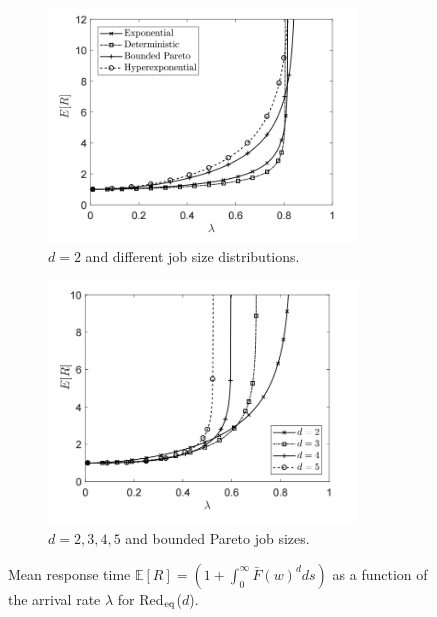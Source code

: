 \documentclass[12pt]{report}
\newcommand{\Redid}{Red$_{\textup{eq}}$($d$)}
\newcommand{\E}{\mathbb{E}}
\begin{document}
\begin{figure}[t]
\begin{subfigure}{.45\textwidth}
\begin{center}
\includegraphics[width=0.9\textwidth]{figures/Chapter3/test.png}
\caption{$d=2$ and different job size distributions.}
\label{fig:MRTdiffjobsizes}
\end{center}
\end{subfigure}
\begin{subfigure}{.45\textwidth}
\begin{center}
\includegraphics[width=0.9\textwidth]{figures/Chapter3/test2.png}
\caption{$d=2,3,4,5$ and bounded Pareto job sizes.}
\label{fig:MRTdiffd_eq}
\end{center}
\end{subfigure}
\caption{Mean response time $\E[R] = \left(1+\int_0^\infty \bar{F}(w)^d ds\right)$ as a function of the arrival rate $\lambda$ for \Redid .}
\label{fig:MRT}
\end{figure}
\end{document}
